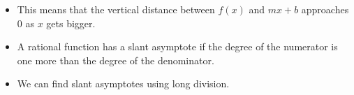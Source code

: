 \begin{frame}
\begin{columns}[c]
{}%
%
\begin{itemize}
\item<2->  This means that the vertical distance between $f(x)$ and $mx+b$ approaches $0$ as $x$ gets bigger.
\item<7->  A rational function has a slant asymptote if the degree of the numerator is one more than the degree of the denominator.
\item<8->  We can find slant asymptotes using long division.
\end{itemize}
\end{columns}
\end{frame}

